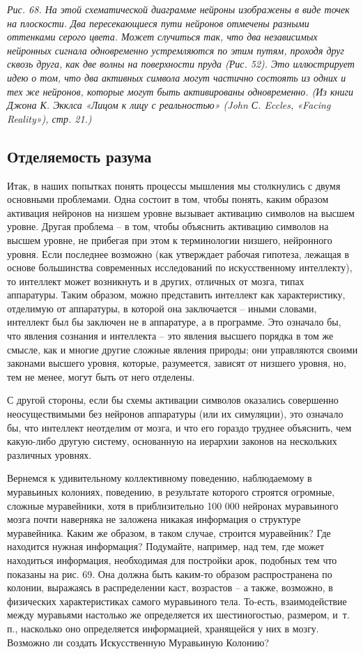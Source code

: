 \documentclass[../main.tex]{subfiles}
\begin{document}
\emph{Рис. 68. На этой схематической диаграмме нейроны изображены в виде точек на плоскости. Два пересекающиеся пути нейронов отмечены разными оттенками серого цвета. Может случиться так, что два независимых нейронных сигнала одновременно устремляются по этим путям, проходя друг сквозь друга, как две волны на поверхности пруда (Рис. 52). Это иллюстрирует идею о том, что два активных символа могут частично состоять из одних и тех же нейронов, которые могут быть активированы одновременно. (Из книги Джона К. Экклса «Лицом к лицу с реальностью» (John С. Eccles, «Facing Reality»), стр. 21.)}


\subsection{Отделяемость разума}

Итак, в наших попытках понять процессы мышления мы столкнулись с двумя основными проблемами. Одна состоит в том, чтобы понять, каким образом активация нейронов на низшем уровне вызывает активацию символов на высшем уровне. Другая проблема \--- в том, чтобы объяснить активацию символов на высшем уровне, не прибегая при этом к терминологии низшего, нейронного уровня. Если последнее возможно (как утверждает рабочая гипотеза, лежащая в основе большинства современных исследований по искусственному интеллекту), то интеллект может возникнуть и в других, отличных от мозга, типах аппаратуры. Таким образом, можно представить интеллект как характеристику, отделимую от аппаратуры, в которой она заключается \--- иными словами, интеллект был бы заключен не в аппаратуре, а в программе. Это означало бы, что явления сознания и интеллекта \--- это явления высшего порядка в том же смысле, как и многие другие сложные явления природы; они управляются своими законами высшего уровня, которые, разумеется, зависят от низшего уровня, но, тем не менее, могут быть от него отделены.

С другой стороны, если бы схемы активации символов оказались совершенно неосуществимыми без нейронов аппаратуры (или их симуляции), это означало бы, что интеллект неотделим от мозга, и что его гораздо труднее объяснить, чем какую-либо другую систему, основанную на иерархии законов на нескольких различных уровнях.

Вернемся к удивительному коллективному поведению, наблюдаемому в муравьиных колониях, поведению, в результате которого строятся огромные, сложные муравейники, хотя в приблизительно 100 000 нейронах муравьиного мозга почти наверняка не заложена никакая информация о структуре муравейника. Каким же образом, в таком случае, строится муравейник? Где находится нужная информация? Подумайте, например, над тем, где может находиться информация, необходимая для постройки арок, подобных тем что показаны на рис. 69. Она должна быть каким-то образом распространена по колонии, выражаясь в распределении каст, возрастов \--- а также, возможно, в физических характеристиках самого муравьиного тела. То-есть, взаимодействие между муравьями настолько же определяется их шестиногостью, размером, и~т.\,п., насколько оно определяется информацией, хранящейся у них в мозгу. Возможно ли создать Искусственную Муравьиную Колонию?
\end{document}
